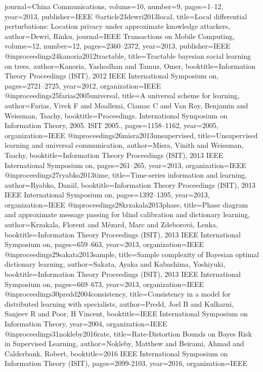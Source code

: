 {{{{{{{	journal={China Communications},
	volume={10},
	number={9},
	pages={1--12},
	year={2013},
	publisher={IEEE}
}
@article{23dewri2013local,
	title={Local differential perturbations: Location privacy under approximate knowledge attackers},
	author={Dewri, Rinku},
	journal={IEEE Transactions on Mobile Computing},
	volume={12},
	number={12},
	pages={2360--2372},
	year={2013},
	publisher={IEEE}
}
@inproceedings{24kanoria2012tractable,
	title={Tractable bayesian social learning on trees},
	author={Kanoria, Yashodhan and Tamuz, Omer},
	booktitle={Information Theory Proceedings (ISIT), 2012 IEEE International Symposium on},
	pages={2721--2725},
	year={2012},
	organization={IEEE}
}
@inproceedings{25farias2005universal,
	title={A universal scheme for learning},
	author={Farias, Vivek F and Moallemi, Ciamac C and Van Roy, Benjamin and Weissman, Tsachy},
	booktitle={Proceedings. International Symposium on Information Theory, 2005. ISIT 2005.},
	pages={1158--1162},
	year={2005},
	organization={IEEE}
}
@inproceedings{26misra2013unsupervised,
	title={Unsupervised learning and universal communication},
	author={Misra, Vinith and Weissman, Tsachy},
	booktitle={Information Theory Proceedings (ISIT), 2013 IEEE International Symposium on},
	pages={261--265},
	year={2013},
	organization={IEEE}
}
@inproceedings{27ryabko2013time,
	title={Time-series information and learning},
	author={Ryabko, Daniil},
	booktitle={Information Theory Proceedings (ISIT), 2013 IEEE International Symposium on},
	pages={1392--1395},
	year={2013},
	organization={IEEE}
}
@inproceedings{28krzakala2013phase,
	title={Phase diagram and approximate message passing for blind calibration and dictionary learning},
	author={Krzakala, Florent and M{\'e}zard, Marc and Zdeborov{\'a}, Lenka},
	booktitle={Information Theory Proceedings (ISIT), 2013 IEEE International Symposium on},
	pages={659--663},
	year={2013},
	organization={IEEE}
}
@inproceedings{29sakata2013sample,
	title={Sample complexity of Bayesian optimal dictionary learning},
	author={Sakata, Ayaka and Kabashima, Yoshiyuki},
	booktitle={Information Theory Proceedings (ISIT), 2013 IEEE International Symposium on},
	pages={669--673},
	year={2013},
	organization={IEEE}
}
@inproceedings{30predd2004consistency,
	title={Consistency in a model for distributed learning with specialists},
	author={Predd, Joel B and Kulkarni, Sanjeev R and Poor, H Vincent},
	booktitle={IEEE International Symposium on Information Theory},
	year={2004},
	organization={IEEE}
}
@inproceedings{31nokleby2016rate,
	title={Rate-Distortion Bounds on Bayes Risk in Supervised Learning},
	author={Nokleby, Matthew and Beirami, Ahmad and Calderbank, Robert},
	booktitle={2016 IEEE International Symposium on Information Theory (ISIT)},
	pages={2099-2103},
	year={2016},
	organization={IEEE}
}

}}}}}}
